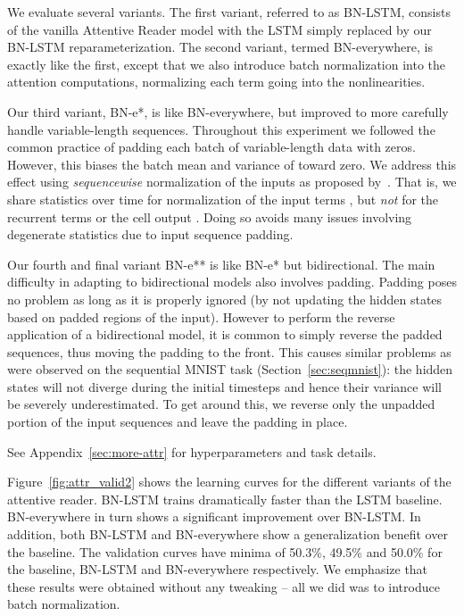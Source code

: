 \documentclass{article} \pdfoutput=1 \usepackage[utf8]{inputenc}
\begin{document}
We evaluate several variants.  The first variant, referred to as BN-LSTM,
consists of the vanilla Attentive Reader model with the LSTM simply replaced by
our BN-LSTM reparameterization.  The second variant, termed BN-everywhere, is
exactly like the first, except that we also introduce batch normalization into
the attention computations, normalizing each term going into the 
nonlinearities.

Our third variant, BN-e*, is like BN-everywhere, but improved to more carefully
handle variable-length sequences.  Throughout this experiment we followed the
common practice of padding each batch of variable-length data with zeros.
However, this biases the batch mean and variance of  toward zero.
We address this effect using \emph{sequencewise} normalization of the inputs as
proposed by~\citet{cesar,baidu}.  That is, we share statistics over time for
normalization of the input terms , but \emph{not} for the
recurrent terms  or the cell output .  Doing
so avoids many issues involving degenerate statistics due to input sequence
padding.

Our fourth and final variant BN-e** is like BN-e* but bidirectional.  The main
difficulty in adapting to bidirectional models also involves padding.  Padding
poses no problem as long as it is properly ignored (by not updating the hidden
states based on padded regions of the input).  However to perform the reverse
application of a bidirectional model, it is common to simply reverse the padded
sequences, thus moving the padding to the front.  This causes similar problems
as were observed on the sequential MNIST task (Section~\ref{sec:seqmnist}): the
hidden states will not diverge during the initial timesteps and hence their
variance will be severely underestimated.  To get around this, we reverse only
the unpadded portion of the input sequences and leave the padding in place.

See Appendix~\ref{sec:more-attr} for hyperparameters and task details.

Figure~\ref{fig:attr_valid2} shows the learning curves for the different
variants of the attentive reader.  BN-LSTM trains dramatically faster than the
LSTM baseline.  BN-everywhere in turn shows a significant improvement over
BN-LSTM.  In addition, both BN-LSTM and BN-everywhere show a generalization
benefit over the baseline.  The validation curves have minima of 50.3\%, 49.5\%
and 50.0\% for the baseline, BN-LSTM and BN-everywhere respectively.  We
emphasize that these results were obtained without any tweaking -- all we did
was to introduce batch normalization.
\end{document}

